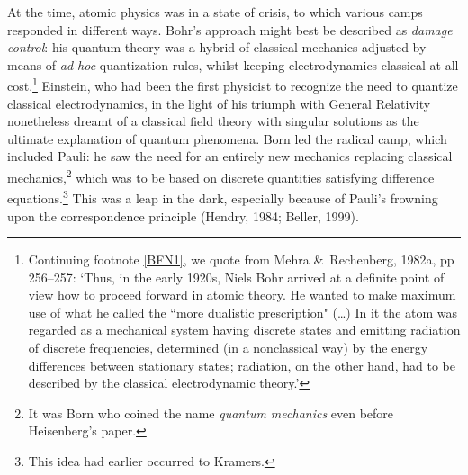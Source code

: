 \documentclass[12pt,titlepage]{article}
\begin{document}
At the time, atomic physics was in a state of crisis, to which various camps 
responded in  different ways. Bohr's approach might best be described as \textit{damage control}: his quantum theory was a hybrid of classical mechanics adjusted by means of \textit{ad hoc} quantization rules, whilst keeping  electrodynamics classical at all cost.\footnote{\label{Bohropp} 
Continuing footnote \ref{BFN1}, we quote from 
 Mehra \&\ Rechenberg, 1982a, pp 256--257: `Thus, in the early 1920s, Niels Bohr arrived at a definite point of view how to proceed forward in atomic theory. He wanted to make maximum use of what he called the ``more dualistic prescription" (\ldots) In it the atom was regarded as a mechanical system having discrete states and emitting radiation of discrete frequencies, determined (in a nonclassical way) by the energy differences between stationary states; radiation, on the other hand, had to be described by the classical electrodynamic theory.'}    Einstein, who had been  the first physicist to recognize the need to quantize classical electrodynamics, in the light of his triumph with General Relativity  nonetheless dreamt of a classical field theory with singular solutions as the ultimate explanation of quantum phenomena. Born led the radical camp, which included Pauli: he saw the need for an entirely new mechanics replacing classical mechanics,\footnote{It was Born who coined the name \textit{quantum mechanics} even before Heisenberg's paper.} which was to be based on discrete quantities satisfying difference equations.\footnote{This idea had earlier occurred to Kramers.}  This was a leap in the dark, especially because of Pauli's frowning upon the correspondence principle (Hendry, 1984; Beller, 1999). 
\end{document}

